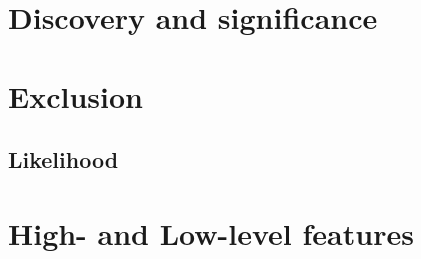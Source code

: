 
\section{Discovery and significance}

\section{Exclusion}
\subsection{Likelihood}
\section{High- and Low-level features}


